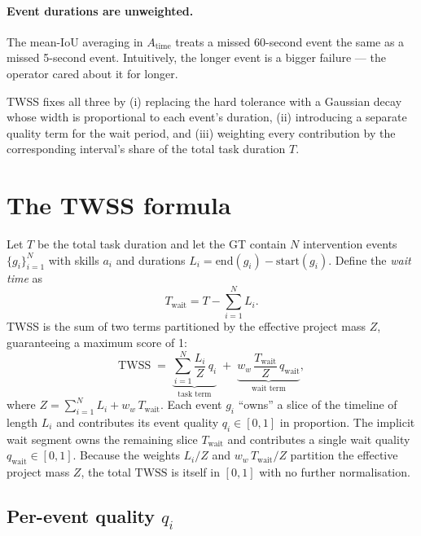 \documentclass[11pt]{article}
\newcommand{\TWSS}{\mathrm{TWSS}}
\newcommand{\Tt}{T}
\newcommand{\Twait}{T_{\text{wait}}}
\newcommand{\qi}{q_i}
\newcommand{\qwait}{q_{\text{wait}}}
\begin{document}
\paragraph{Event durations are unweighted.}
The mean-IoU averaging in $A_{\text{time}}$ treats a missed 60-second
event the same as a missed 5-second event. Intuitively, the longer
event is a bigger failure --- the operator cared about it for longer.

TWSS fixes all three by (i) replacing the hard tolerance with a
Gaussian decay whose width is proportional to each event's duration,
(ii) introducing a separate quality term for the wait period, and
(iii) weighting every contribution by the corresponding interval's
share of the total task duration $\Tt$.

\section{The TWSS formula}
\label{sec:formula}

Let $\Tt$ be the total task duration and let the GT contain $N$
intervention events $\{g_i\}_{i=1}^N$ with skills $a_i$ and durations
$L_i = \mathrm{end}(g_i) - \mathrm{start}(g_i)$. Define the
\emph{wait time} as
\begin{equation}
  \Twait = \Tt - \sum_{i=1}^N L_i.
  \label{eq:Twait}
\end{equation}
TWSS is the sum of two terms partitioned by the effective project mass
$Z$, guaranteeing a maximum score of 1:
\begin{equation}
  \boxed{\;
    \TWSS \;=\; \underbrace{\sum_{i=1}^N \frac{L_i}{Z}\,\qi}_{\text{task term}}
              \;+\; \underbrace{w_w\,\frac{\Twait}{Z}\,\qwait}_{\text{wait term}},
  \;}
  \label{eq:twss}
\end{equation}
where $Z = \sum_{i=1}^N L_i + w_w\,\Twait$.
Each event $g_i$ ``owns'' a slice of the timeline of length $L_i$ and
contributes its event quality $\qi \in [0, 1]$ in proportion. The
implicit wait segment owns the remaining slice $\Twait$ and
contributes a single wait quality $\qwait \in [0, 1]$. Because the
weights $L_i / Z$ and $w_w\,\Twait / Z$ partition the effective project mass $Z$,
the total $\TWSS$ is itself in $[0, 1]$ with no further normalisation.

\subsection{Per-event quality $\qi$}
\label{sec:qi}
\end{document}
